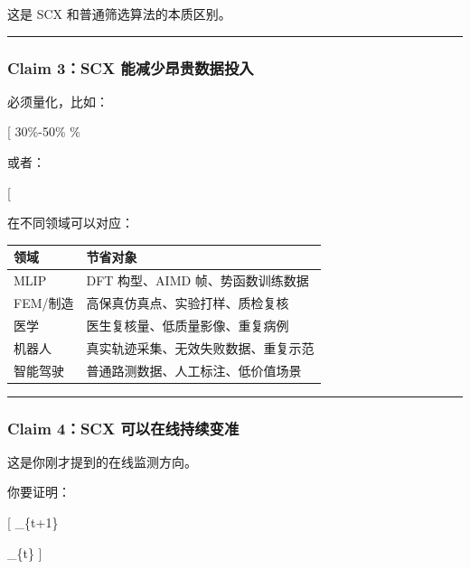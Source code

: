 \documentclass[
  12pt,
]{ctexart}
\begin{document}
这是 SCX 和普通筛选算法的本质区别。

\begin{center}\rule{0.5\linewidth}{0.5pt}\end{center}

\subsubsection{Claim 3：SCX
能减少昂贵数据投入}\label{claim-3scx-ux80fdux51cfux5c11ux6602ux8d35ux6570ux636eux6295ux5165}

必须量化，比如：

{[} 30\%-50\%  \% \text{ full-data performance}{]}

或者：

{[} 
\Rightarrow \text{higher accuracy / lower failure rate}{]}

在不同领域可以对应：

\begin{longtable}[]{@{}ll@{}}
\toprule\noalign{}
领域 & 节省对象 \\
\midrule\noalign{}
\endhead
\bottomrule\noalign{}
\endlastfoot
MLIP & DFT 构型、AIMD 帧、势函数训练数据 \\
FEM/制造 & 高保真仿真点、实验打样、质检复核 \\
医学 & 医生复核量、低质量影像、重复病例 \\
机器人 & 真实轨迹采集、无效失败数据、重复示范 \\
智能驾驶 & 普通路测数据、人工标注、低价值场景 \\
\end{longtable}

\begin{center}\rule{0.5\linewidth}{0.5pt}\end{center}

\subsubsection{Claim 4：SCX
可以在线持续变准}\label{claim-4scx-ux53efux4ee5ux5728ux7ebfux6301ux7eedux53d8ux51c6}

这是你刚才提到的在线监测方向。

你要证明：

{[} \_\{t+1\}

\begin{quote}
\end{quote}

\_\{t\} {]}
\end{document}

